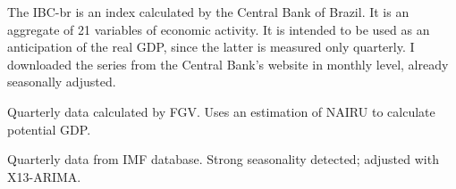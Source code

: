 The IBC-br is an index calculated by the Central Bank of Brazil. It is an aggregate of 21 variables of economic activity. It is intended to be used as an anticipation of the real GDP, since the latter is measured only quarterly. I downloaded the series from the Central Bank's website in monthly level, already seasonally adjusted.

Quarterly data calculated by FGV. Uses an estimation of NAIRU to calculate potential GDP.

Quarterly data from IMF database. Strong seasonality detected; adjusted with X13-ARIMA.





 